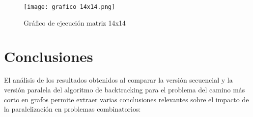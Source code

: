 \documentclass[12pt]{article}
\begin{document}
\begin{figure}[H]
    \centering
    \texttt{[image: grafico 14x14.png]}
    \caption{Gráfico de ejecución matriz 14x14}
    \label{fig:enter-label4}
\end{figure}

\clearpage
\section*{Conclusiones}

El análisis de los resultados obtenidos al comparar la versión secuencial y la versión paralela del algoritmo de backtracking para el problema del camino más corto en grafos permite extraer varias conclusiones relevantes sobre el impacto de la paralelización en problemas combinatorios:
\end{document}
